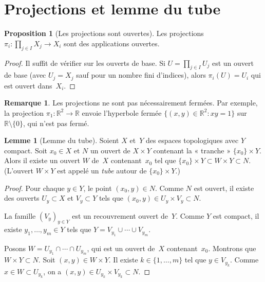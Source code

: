 \documentclass[12pt,a4paper,openany]{book}
\theoremstyle{definition}
\theoremstyle{cours}
\newtheorem{proposition}[theoreme]{Proposition}
\newtheorem{lemme}[theoreme]{Lemme}
\theoremstyle{coursnormal}
\newtheorem{remarque}[theoreme]{Remarque}
\begin{document}
\section{Projections et lemme du tube}
\label{sec:projections-tube}

\begin{proposition}[Les projections sont ouvertes]
\label{prop:projection-ouverte}
Les projections $\pi_i \colon \prod_{j \in I} X_j \to X_i$ sont des applications
ouvertes.
\end{proposition}

\begin{proof}
Il suffit de vérifier sur les ouverts de base. Si $U = \prod_{j \in I} U_j$ est
un ouvert de base (avec $U_j = X_j$ sauf pour un nombre fini d'indices), alors
$\pi_i(U) = U_i$ qui est ouvert dans~$X_i$.
\end{proof}

\begin{remarque}
\label{rem:projection-non-fermee}
Les projections ne sont pas nécessairement fermées. Par exemple, la projection
$\pi_1 \colon \mathbb{R}^2 \to \mathbb{R}$ envoie l'hyperbole fermée
$\{(x,y) \in \mathbb{R}^2 : xy = 1\}$ sur $\mathbb{R} \setminus \{0\}$, qui
n'est pas fermé.
\end{remarque}

\begin{lemme}[Lemme du tube]
\label{lem:tube}
Soient $X$ et~$Y$ des espaces topologiques avec $Y$ compact. Soit $x_0 \in X$
et $N$ un ouvert de $X \times Y$ contenant la « tranche »
$\{x_0\} \times Y$. Alors il existe un ouvert $W$ de~$X$ contenant~$x_0$ tel que
$\{x_0\} \times Y \subset W \times Y \subset N$.
(L'ouvert $W \times Y$ est appelé un \emph{tube} autour de $\{x_0\} \times Y$.)
\end{lemme}

\begin{proof}
Pour chaque $y \in Y$, le point $(x_0, y) \in N$. Comme $N$ est ouvert, il existe
des ouverts $U_y \subset X$ et $V_y \subset Y$ tels que
$(x_0, y) \in U_y \times V_y \subset N$.

La famille $(V_y)_{y \in Y}$ est un recouvrement ouvert de~$Y$. Comme $Y$ est
compact, il existe $y_1, \ldots, y_m \in Y$ tels que
$Y = V_{y_1} \cup \cdots \cup V_{y_m}$.

Posons $W = U_{y_1} \cap \cdots \cap U_{y_m}$, qui est un ouvert de~$X$ contenant~$x_0$.
Montrons que $W \times Y \subset N$. Soit $(x, y) \in W \times Y$. Il existe
$k \in \{1, \ldots, m\}$ tel que $y \in V_{y_k}$. Comme $x \in W \subset U_{y_k}$,
on a $(x, y) \in U_{y_k} \times V_{y_k} \subset N$.
\end{proof}
\end{document}
